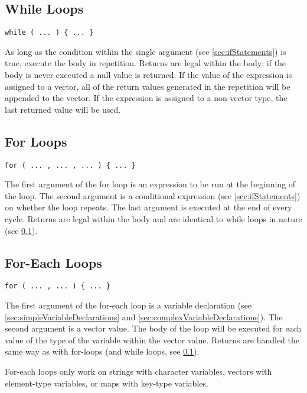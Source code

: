 \documentclass[10pt,a4paper]{article}
\begin{document}
\subsection{While Loops}
\label{sec:whileLoops}
\begin{verbatim}
while ( ... ) { ... }
\end{verbatim}

As long as the condition within the single argument (see \ref{sec:ifStatements}) is true, execute the body in repetition. Returns are legal within the body; if the body is never executed a null value is returned. If the value of the expression is assigned to a vector, all of the return values generated in the repetition will be appended to the vector. If the expression is assigned to a non-vector type, the last returned value will be used.

\subsection{For Loops}
\begin{verbatim}
for ( ... , ... , ... ) { ... }
\end{verbatim}

The first argument of the for loop is an expression to be run at the beginning of the loop. The second argument is a conditional expression (see \ref{sec:ifStatements}) on whether the loop repeats. The last argument is executed at the end of every cycle. Returns are legal within the body and are identical to while loops in nature (see \ref{sec:whileLoops}).

\subsection{For-Each Loops}
\begin{verbatim}
for ( ... , ... ) { ... }
\end{verbatim}

The first argument of the for-each loop is a variable declaration (see \ref{sec:simpleVariableDeclarations} and \ref{sec:complexVariableDeclarations}). The second argument is a vector value. The body of the loop will be executed for each value of the type of the variable within the vector value. Returns are handled the same way as with for-loops (and while loops, see \ref{sec:whileLoops}).

For-each loops only work on strings with character variables, vectors with element-type variables, or maps with key-type variables.
\end{document}
